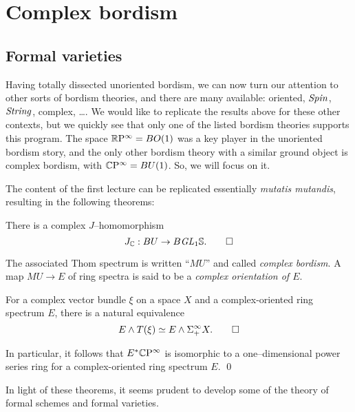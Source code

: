 
\chapter{Complex bordism}




\section{Formal varieties}

Having totally dissected unoriented bordism, we can now turn our attention to other sorts of bordism theories, and there are many available: oriented, $\mathit{Spin}$, $\mathit{String}$, complex, \ldots.  We would like to replicate the results above for these other contexts, but we quickly see that only one of the listed bordism theories supports this program.  The space $\mathbb R\mathrm P^\infty = BO(1)$ was a key player in the unoriented bordism story, and the only other bordism theory with a similar ground object is complex bordism, with $\mathbb{C}\mathrm P^\infty = BU(1)$.  So, we will focus on it.

The content of the first lecture can be replicated essentially \textit{mutatis mutandis}, resulting in the following theorems:
\begin{theorem}
There is a complex $J$--homomorphism \[J_{\mathbb{C}}: BU \to B \mathit{GL}_1 \mathbb S. \qed \]
\end{theorem}

\begin{definition}
The associated Thom spectrum is written ``$MU$'' and called \textit{complex bordism}.  A map $MU \to E$ of ring spectra is said to be a \textit{complex orientation of $E$}.
\end{definition}

\begin{theorem}
For a complex vector bundle $\xi$ on a space $X$ and a complex-oriented ring spectrum $E$, there is a natural equivalence \[E \wedge T(\xi) \simeq E \wedge \Sigma^\infty_+ X. \qed\]
\end{theorem}

\begin{corollary}\label{CPinftyNiceCalculation}
In particular, it follows that $E^* \mathbb{C}\mathrm P^\infty$ is isomorphic to a one--dimensional power series ring for a complex-oriented ring spectrum $E$. \qed
\end{corollary}

In light of these theorems, it seems prudent to develop some of the theory of formal schemes and formal varieties.



